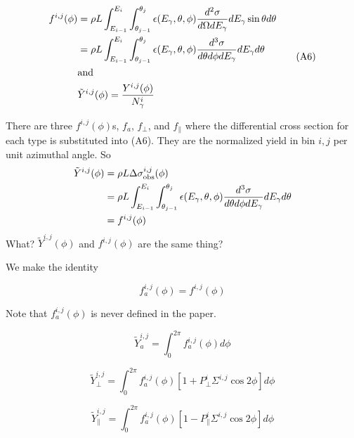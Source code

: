 \documentclass{article}
\begin{document}
\begin{equation}
  \begin{split}
f^{i,j}(\phi) & = \rho L\int^{E_i}_{E_{i-1}}\int_{\theta_{j-1}}^{\theta_j} \epsilon(E_\gamma,\theta,\phi) {d^2\sigma \over d\Omega dE_\gamma} dE_\gamma \sin\theta d\theta \\
& = \rho L\int^{E_i}_{E_{i-1}}\int_{\theta_{j-1}}^{\theta_j} \epsilon(E_\gamma,\theta,\phi) {d^3\sigma \over d\theta d\phi dE_\gamma} dE_\gamma d\theta \\
& {\rm and} \\
& \tilde Y^{i,j}(\phi) = {Y^{i,j}(\phi) \over N^i_\gamma}
\end{split} \tag{A6}
\end{equation}

There are three $f^{i,j}(\phi)$s, $f_a$, $f_\perp$, and $f_\parallel$ where the differential cross section for each type is substituted into (A6). They are the normalized yield in bin $i,j$ per unit azimuthal angle. So
\begin{equation}
  \begin{split}
    \tilde Y^{i,j}(\phi) & = \rho L\Delta\sigma^{i,j}_{\rm obs}(\phi) \\
    & = \rho L\int^{E_i}_{E_{i-1}}\int_{\theta_{j-1}}^{\theta_j} \epsilon(E_\gamma,\theta,\phi) {d^3\sigma \over d\theta d\phi dE_\gamma} dE_\gamma d\theta \\
    & = f^{i,j}(\phi)
  \end{split}
\end{equation}
What? $\tilde Y^{i,j}(\phi)$ and $f^{i,j}(\phi)$ are the same thing?

We make the identity

\begin{equation}
  f^{i,j}_a(\phi) = f^{i,j}(\phi)
\end{equation}

Note that $f^{i,j}_a(\phi)$ is never defined in the paper.

\begin{equation}
  \tilde Y^{i,j}_a = \int^{2\pi}_0 f^{i,j}_a(\phi)d\phi
  \tag{A7}
\end{equation}

\begin{equation}
  \tilde Y^{i,j}_\perp = \int^{2\pi}_0 f^{i,j}_a(\phi)[1+P^i_\perp\Sigma^{i,j}\cos2\phi]d\phi
  \tag{A8}
\end{equation}

\begin{equation}
  \tilde Y^{i,j}_\parallel = \int^{2\pi}_0 f^{i,j}_a(\phi)[1-P^i_\parallel\Sigma^{i,j}\cos2\phi]d\phi
  \tag{A9}
\end{equation}
\end{document}
